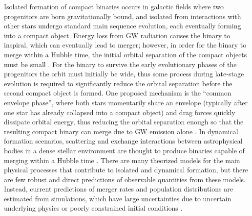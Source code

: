 Isolated formation of compact binaries occurs in galactic fields where two progenitors are born gravitationally bound, and isolated from interactions with other stars undergo standard main sequence evolution, each eventually forming into a compact object. Energy loss from GW radiation causes the binary to inspiral, which can eventually lead to merger; however, in order for the binary to merge within a Hubble time, the initial orbital separation of the compact objects must be small \citep{10.1051/0004-6361/201936204,10.1007/s41114-021-00034-3}. For the binary to survive the early evolutionary phases of the progenitors the orbit must initially be wide, thus some process during late-stage evolution is required to significantly reduce the orbital separation before the second compact object is formed. One proposed mechanism is the ``common envelope phase'', where both stars momentarily share an envelope (typically after one star has already collapsed into a compact object) and drag forces quickly dissipate orbital energy, thus reducing the orbital separation enough so that the resulting compact binary can merge due to GW emission alone \citep{10.1038/nature18322}. In dynamical formation scenarios, scattering and exchange interactions between astrophysical bodies in a dense stellar environment are thought to produce binaries capable of merging within a Hubble time \citep{1602.02444}. There are many theorized models for the main physical processes that contribute to isolated and dynamical formation, but there are few robust and direct predictions of observable quantities from these models. Instead, current predictions of merger rates and population distributions are estimated from simulations, which have large uncertainties due to uncertain underlying physics or poorly constrained initial conditions \citep{10.1007/s41114-021-00034-3,10.1051/0004-6361/201936204,1806.00001v3,1308.1546}.

